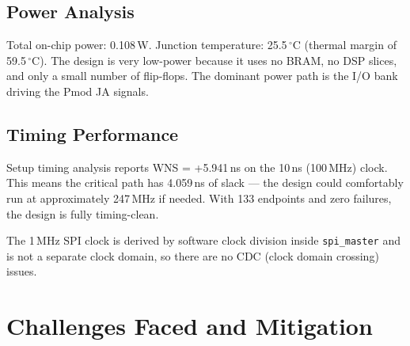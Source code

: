 \documentclass[12pt,a4paper]{report}
\begin{document}
\section{Power Analysis}

Total on-chip power: 0.108\,W. Junction temperature: 25.5\,$^\circ$C (thermal margin of 59.5\,$^\circ$C). The design is very low-power because it uses no BRAM, no DSP slices, and only a small number of flip-flops. The dominant power path is the I/O bank driving the Pmod JA signals.

\section{Timing Performance}

Setup timing analysis reports WNS = +5.941\,ns on the 10\,ns (100\,MHz) clock. This means the critical path has 4.059\,ns of slack --- the design could comfortably run at approximately 247\,MHz if needed. With 133 endpoints and zero failures, the design is fully timing-clean.

The 1\,MHz SPI clock is derived by software clock division inside \texttt{spi\_master} and is not a separate clock domain, so there are no CDC (clock domain crossing) issues.

\chapter{Challenges Faced and Mitigation}
\end{document}

